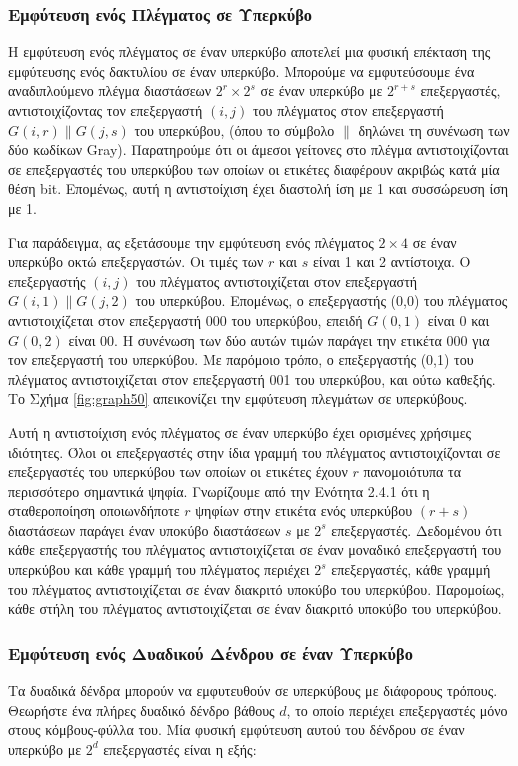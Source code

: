 \documentclass[12pt,a4paper]{article} %
\begin{document}
\subsubsection{Εμφύτευση ενός Πλέγματος σε Υπερκύβο}
Η εμφύτευση ενός πλέγματος σε έναν υπερκύβο αποτελεί μια φυσική επέκταση 
της εμφύτευσης ενός δακτυλίου σε έναν υπερκύβο. Μπορούμε να εμφυτεύσουμε
ένα αναδιπλούμενο πλέγμα διαστάσεων $2^r \times 2^s$ σε έναν υπερκύβο με 
$2^{r+s}$ επεξεργαστές, αντιστοιχίζοντας τον επεξεργαστή $(i,j)$ του 
πλέγματος στον επεξεργαστή $G(i,r) \parallel G(j,s)$ του υπερκύβου, (όπου το 
σύμβολο $\parallel$ δηλώνει τη συνένωση των δύο κωδίκων Gray).
Παρατηρούμε ότι οι άμεσοι γείτονες στο πλέγμα αντιστοιχίζονται σε 
επεξεργαστές του υπερκύβου των οποίων οι ετικέτες διαφέρουν ακριβώς κατά 
μία θέση bit. Επομένως, αυτή η αντιστοίχιση 
έχει διαστολή ίση με 1 και συσσώρευση ίση με 1.

Για παράδειγμα, ας εξετάσουμε την εμφύτευση ενός πλέγματος $2 \times 4$
σε έναν υπερκύβο οκτώ επεξεργαστών. Οι τιμές των $r$ και $s$ είναι 1 και 
2 αντίστοιχα. Ο επεξεργαστής $(i,j)$ του πλέγματος αντιστοιχίζεται στον 
επεξεργαστή $G(i,1)\parallel G(j,2)$ του υπερκύβου. Επομένως, ο 
επεξεργαστής (0,0) του πλέγματος αντιστοιχίζεται στον επεξεργαστή 000 
του υπερκύβου, επειδή $G(0,1)$ είναι 0 και $G(0,2)$ είναι 00. Η συνένωση των δύο αυτών 
τιμών παράγει την ετικέτα 000 για τον επεξεργαστή του υπερκύβου. Με 
παρόμοιο τρόπο, ο επεξεργαστής (0,1) του πλέγματος αντιστοιχίζεται στον 
επεξεργαστή 001 του υπερκύβου, και ούτω καθεξής. Το Σχήμα \ref{fig:graph50}
απεικονίζει την εμφύτευση πλεγμάτων σε υπερκύβους.

Αυτή η αντιστοίχιση ενός πλέγματος σε έναν υπερκύβο έχει ορισμένες 
χρήσιμες ιδιότητες. Όλοι οι επεξεργαστές στην ίδια γραμμή του πλέγματος 
αντιστοιχίζονται σε επεξεργαστές του υπερκύβου των οποίων οι ετικέτες 
έχουν $r$ πανομοιότυπα τα περισσότερο σημαντικά ψηφία. Γνωρίζουμε από την 
Ενότητα 2.4.1 ότι η σταθεροποίηση οποιωνδήποτε $r$ ψηφίων στην ετικέτα 
ενός υπερκύβου $(r+s)$ διαστάσεων παράγει έναν υποκύβο διαστάσεων $s$ με 
$2^s$ επεξεργαστές. Δεδομένου ότι κάθε επεξεργαστής του πλέγματος 
αντιστοιχίζεται σε έναν μοναδικό επεξεργαστή του υπερκύβου και κάθε 
γραμμή του πλέγματος περιέχει $2^s$ επεξεργαστές, κάθε γραμμή του πλέγματος 
αντιστοιχίζεται σε έναν διακριτό υποκύβο του υπερκύβου. Παρομοίως, κάθε 
στήλη του πλέγματος αντιστοιχίζεται σε έναν διακριτό υποκύβο του υπερκύβου.

\subsubsection{Εμφύτευση ενός Δυαδικού Δένδρου σε έναν Υπερκύβο}
Τα δυαδικά δένδρα μπορούν να εμφυτευθούν σε υπερκύβους με διάφορους τρόπους. 
Θεωρήστε ένα πλήρες δυαδικό δένδρο βάθους $d$, το οποίο περιέχει 
επεξεργαστές μόνο στους κόμβους-φύλλα του. Μία φυσική εμφύτευση αυτού του 
δένδρου σε έναν υπερκύβο με $2^d$ επεξεργαστές είναι η εξής:
\end{document}

